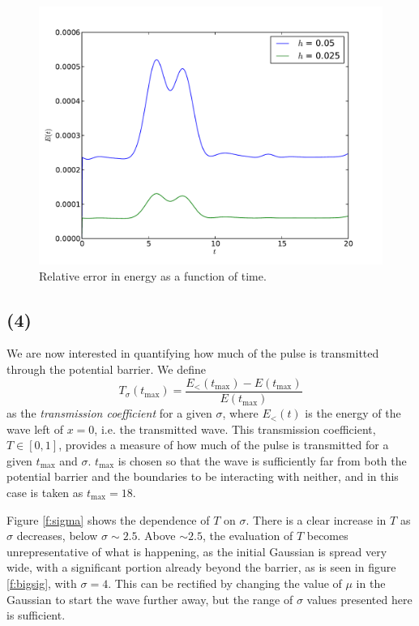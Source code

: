 \documentclass[10pt]{article}
\begin{document}
\begin{figure}
  \centering
  \includegraphics[width=\textwidth]{2/En.pdf}
  \caption{Relative error in energy as a function of time.}
  \label{f:hstudy2}
\end{figure}


\clearpage
\subsection*{(4)}
We are now interested in quantifying how much of the pulse is transmitted through
the potential barrier. We define
\begin{equation}
T_\sigma(t_\text{max}) = \frac{E_<(t_\text{max}) - E(t_\text{max})}{E(t_\text{max})}
\label{e:T}
\end{equation}
as the {\it transmission coefficient} for a given $\sigma$,
where $E_<(t)$ is the energy of the wave left of $x=0$, i.e. the transmitted wave.
This transmission coefficient, $T\in[0,1]$, provides a measure of how much of the pulse
is transmitted for a given $t_\text{max}$ and $\sigma$.
$t_\text{max}$ is chosen so that the wave is sufficiently far from both the potential
barrier and the boundaries to be interacting with neither, and in this case is taken as
$t_\text{max} = 18$.

Figure \ref{f:sigma} shows the dependence of $T$ on $\sigma$. There is a clear
increase in $T$ as $\sigma$ decreases, below $\sigma \sim 2.5$. Above $\sim 2.5$,
the evaluation of $T$ becomes unrepresentative of what is happening, as
the initial Gaussian is spread very wide, with a significant portion already beyond
the barrier, as is seen in figure \ref{f:bigsig}, with $\sigma = 4$.
This can be rectified by changing the value of $\mu$ in the Gaussian to start the
wave further away, but the range of $\sigma$ values presented here is sufficient.
\end{document}
